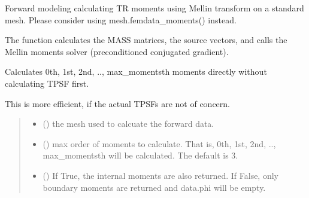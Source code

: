 \documentclass[letterpaper,10pt,english]{sphinxmanual}
\begin{document}
\begin{fulllineitems}
\label{\detokenize{_autosummary/nirfasterff.forward.femdata.femdata_stnd_TR_moments:nirfasterff.forward.femdata.femdata_stnd_TR_moments}}
\pysigstartsignatures
\pysiglinewithargsret
{}
{\sphinxparamcomma {}\sphinxparamcomma {}\sphinxparamcomma {}\sphinxparamcomma {}}
{}
\pysigstopsignatures
\sphinxAtStartPar
Forward modeling calculating TR moments using Mellin transform on a standard mesh. Please consider using mesh.femdata\_moments() instead.

\sphinxAtStartPar
The function calculates the MASS matrices, the source vectors, and calls the Mellin moments solver (preconditioned conjugated gradient).

\sphinxAtStartPar
Calculates 0th, 1st, 2nd, .., max\_moments\sphinxhyphen{}th moments directly without calculating TPSF first.

\sphinxAtStartPar
This is more efficient, if the actual TPSFs are not of concern.
\begin{quote}\begin{description}
\begin{itemize}
\item {} 
\sphinxAtStartPar
{} () \textendash{} the mesh used to calcuate the forward data.

\item {} 
\sphinxAtStartPar
{} (\sphinxstyleliteralemphasis{\sphinxupquote{, }}) \textendash{} max order of moments to calculate. That is, 0th, 1st, 2nd, .., max\_moments\sphinxhyphen{}th will be calculated. The default is 3.

\item {} 
\sphinxAtStartPar
{} (\sphinxstyleliteralemphasis{\sphinxupquote{, }}) \textendash{} 
\sphinxAtStartPar
If True, the internal moments are also returned. If False, only boundary moments are returned and data.phi will be empty.


\end{itemize}
\end{description}
\end{quote}
\end{fulllineitems}
\end{document}
